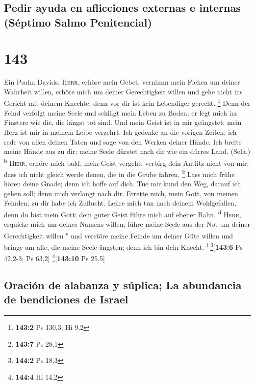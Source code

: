 \hypertarget{pedir-ayuda-en-aflicciones-externas-e-internas-suxe9ptimo-salmo-penitencial}{%
\subsection{Pedir ayuda en aflicciones externas e internas (Séptimo
Salmo
Penitencial)}\label{pedir-ayuda-en-aflicciones-externas-e-internas-suxe9ptimo-salmo-penitencial}}

\hypertarget{section-142}{%
\section{143}\label{section-142}}

 Ein Psalm Davids. \textsc{Herr}, erhöre mein Gebet,
vernimm mein Flehen um deiner Wahrheit willen, erhöre mich um deiner
Gerechtigkeit willen  und gehe nicht ins Gericht mit
deinem Knechte; denn vor dir ist kein Lebendiger gerecht. \footnote{\textbf{143:2}
  Ps 130,3; Hi 9,2}  Denn der Feind verfolgt meine Seele
und schlägt mein Leben zu Boden; er legt mich ins Finstere wie die, die
längst tot sind.  Und mein Geist ist in mir geängstet;
mein Herz ist mir in meinem Leibe verzehrt.  Ich gedenke
an die vorigen Zeiten; ich rede von allen deinen Taten und sage von den
Werken deiner Hände.  Ich breite meine Hände aus zu dir;
meine Seele dürstet nach dir wie ein dürres Land. (Sela.)
\textsuperscript{b}  \textsc{Herr}, erhöre mich bald, mein
Geist vergeht; verbirg dein Antlitz nicht von mir, dass ich nicht gleich
werde denen, die in die Grube fahren. \footnote{\textbf{143:7} Ps 28,1}
 Lass mich frühe hören deine Gnade; denn ich hoffe auf
dich. Tue mir kund den Weg, darauf ich gehen soll; denn mich verlangt
nach dir.  Errette mich, mein Gott, von meinen Feinden; zu
dir habe ich Zuflucht.  Lehre mich tun nach deinem
Wohlgefallen, denn du bist mein Gott; dein guter Geist führe mich auf
ebener Bahn. \textsuperscript{d}  \textsc{Herr}, erquicke
mich um deines Namens willen; führe meine Seele aus der Not um deiner
Gerechtigkeit willen \textsuperscript{e}  und verstöre
meine Feinde um deiner Güte willen und bringe um alle, die meine Seele
ängsten; denn ich bin dein Knecht. \textsuperscript{f}
\footnote{\textbf{144:2} Ps 18,3}{[}\textbf{143:6} Ps 42,2-3; Ps 63,2{]}
\footnote{\textbf{144:4} Hi 14,2}{[}\textbf{143:10} Ps 25,5{]}

\hypertarget{oraciuxf3n-de-alabanza-y-suxfaplica-la-abundancia-de-bendiciones-de-israel}{%
\subsection{Oración de alabanza y súplica; La abundancia de bendiciones
de
Israel}\label{oraciuxf3n-de-alabanza-y-suxfaplica-la-abundancia-de-bendiciones-de-israel}}

